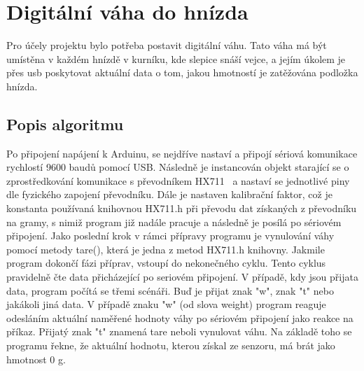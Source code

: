 \section{Digitální váha do hnízda}\label{sec:digitalni-vaha-do-hnizda}
Pro účely projektu bylo potřeba postavit digitální váhu.
Tato váha má být umístěna v každém hnízdě v kurníku, kde slepice snáší vejce, a jejím úkolem je přes \gls{usb} poskytovat aktuální data o tom, jakou hmotností je zatěžována podložka hnízda.

\subsection*{Popis algoritmu}
Po připojení napájení k Arduinu, se nejdříve nastaví a připojí sériová komunikace rychlostí 9600 baudů pomocí USB.
Následně je instancován objekt starající se o zprostředkování komunikace s převodníkem HX711~\cite{tenzosenzorahx711} a nastaví se jednotlivé piny dle fyzického zapojení převodníku.
Dále je nastaven kalibrační faktor, což je konstanta používaná knihovnou HX711.h při převodu dat získaných z převodníku na gramy, s nimiž program již nadále pracuje a následně je posílá po sériovém připojení.
Jako poslední krok v rámci přípravy programu je vynulování váhy pomocí metody tare(), která je jedna z metod HX711.h knihovny.
Jakmile program dokončí fázi příprav, vstoupí do nekonečného cyklu.
Tento cyklus pravidelně čte data přicházející po seriovém připojení.
V případě, kdy jsou přijata data, program počítá se třemi scénáři.
Buď je přijat znak "w", znak "t" nebo jakákoli jiná data.
V případě znaku "w" (od slova weight) program reaguje odesláním aktuální naměřené hodnoty váhy po sériovém připojení jako reakce na příkaz.
Přijatý znak "t" znamená tare neboli vynulovat váhu.
Na základě toho se programu řekne, že aktuální hodnotu, kterou získal ze senzoru, má brát jako hmotnost 0 g.


